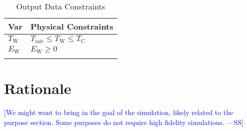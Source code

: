\documentclass[12pt]{article}
\newcommand{\authornote}[3]{\textcolor{#1}{[#3 ---#2]}}
\newcommand{\authornote}[3]{}
\newcommand{\wss}[1]{\authornote{blue}{SS}{#1}}
\begin{document}
\begin{longtable}{l l}
\toprule
\textbf{Var} & \textbf{Physical Constraints}
\\
\midrule
\endhead
${T_{\text{W}}}$ & ${T_{\text{init}}}\leq{}{T_{\text{W}}}\leq{}{T_{\text{C}}}$
\\
${E_{\text{W}}}$ & ${E_{\text{W}}}\geq{}0$
\\
\bottomrule
\caption{Output Data Constraints}
\label{Table:OutDataConstraints}
\end{longtable}

\section{Rationale} \label{Sec:Rationale}

\wss{We might want to bring in the goal of the simulation, likely related to the
purpose section.  Some purposes do not require high fidelity simulations.}
\end{document}
